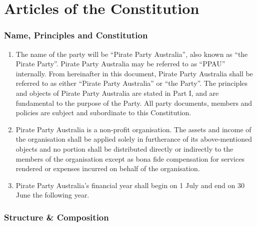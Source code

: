 \documentclass[a4paper,titlepage,8.5pt]{article}
\begin{document}
\part{Articles of the Constitution}

\section{Name, Principles and Constitution}

\begin{enumerate}
\item The name of the party will be ``Pirate Party Australia'', also known as ``the Pirate Party''. Pirate Party Australia may be referred to as ``PPAU'' internally. From hereinafter in this document, Pirate Party Australia shall be referred to as either ``Pirate Party Australia'' or ``the Party''. The principles and objects of Pirate Party Australia are stated in Part I, and are fundamental to the purpose of the Party. All party documents, members and policies are subject and subordinate to this Constitution.
\item Pirate Party Australia is a non-profit organisation. The assets and income of the organisation shall be applied solely in furtherance of its above-mentioned objects and no portion shall be distributed directly or indirectly to the members of the organisation except as bona fide compensation for services rendered or expenses incurred on behalf of the organisation.
\item Pirate Party Australia's financial year shall begin on 1 July and end on 30 June the following year.
\end{enumerate}

\section{Structure \& Composition}
\end{document}

